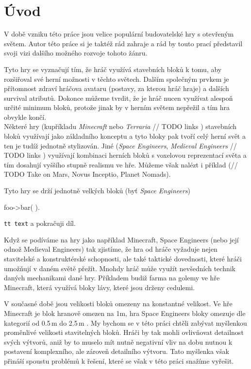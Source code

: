 
\chapter*{Úvod}

V době vzniku této práce jsou velice populární budovatelské hry s otevřeným světem. Autor této práce si je taktéž rád zahraje a rád by touto prací představil svoji vizi dalšího možného rozvoje tohoto žánru.

Tyto hry se vyznačují tím, že hráč využívá stavebních bloků k tomu, aby rozšiřoval své herní možnosti v těchto světech. Dalším společným prvkem je přítomnost zdraví hráčova avataru (postavy, za kterou hráč hraje) a dalších survival atributů. Dokonce můžeme tvrdit, že je hráč nucen využívat alespoň určité minimum bloků, protože jinak by v herním světem nepřežil a tím hra obvykle končí. \\


Některé hry (kupříkladu \textit{Minecraft} nebo \textit{Terraria} // TODO links ) stavebních bloků využívají jako základního konceptu a tyto bloky pak tvoří celý herní svět a ten je tudíž jednotně stylizován. Jiné (\textit{Space Engineers}, \textit{Medieval Engineers} // TODO links ) využívají kombinaci herních bloků s voxelovou reprezentací světa a tím dosahují vyššího stupně realismu ve hře.
Můžeme však nalézt i příklad (// TODO Take on Mars, Novus Inceptio, Planet Nomads).

Tyto hry se drží jednotně velkých bloků (byť \textit{Space Engineers})


\begin{code}
  foo->bar( ).
\end{code}

{\tt tt text} a pokračuji díl.


Když se podíváme na hry jako například Minecraft, Space Engineers (nebo její odnož Medieval Engineers) tak zjistíme, že hra od hráče vyžaduje nejen stavitelské a konstruktérské schopnosti, ale také taktické dovednosti, které hráči umožňují v daném světě přežít. Mnohdy hráč může využít nevšedních technik daných mechanikami dané hry. Příkladem budiž farma na golemy ve hře Minecraft, která využívá bloky lávy, které jsou drženy cedulemi\citep{minecraft_tut_farm}.

V současné době jsou velikosti bloků omezeny na konstantné velikost. Ve hře Minecraft je blok hranově omezen na 1m, hra Space Engineers bloky omezuje dle kategorií od 0.5\,\rm m do 2.5\,\rm m \citep{se_blocks_wiki}.
My bychom se v této práci chtěli zabývat myšlenkou proměnlivé velikosti stavitelných bloků. Hráči by tak mohli ovlivňovat detailnost svých výtvorů, aniž by to muselo mít nutně negativní vliv na dobu nutnou k postavení komplexního, ale zároveň detailního výtvoru. Tato myšlenka však přináší spoustu problémů k řešení, které se však v této práci snažíme vyřešit.

